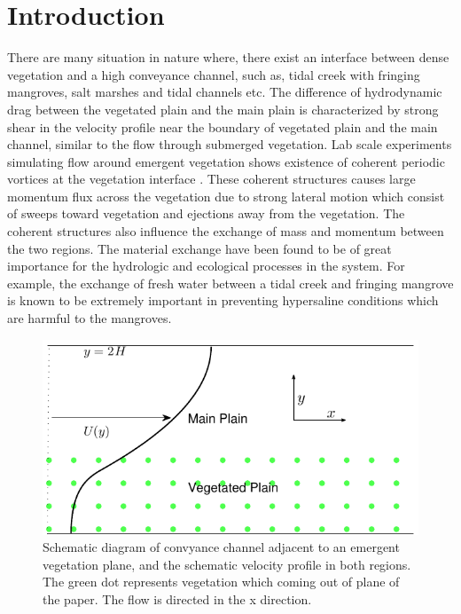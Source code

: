 \documentclass[12pt]{report}   %
\begin{document}
\section{Introduction}
There are many situation in nature where, there exist an interface between dense vegetation and a high conveyance channel, such as, tidal creek with fringing mangroves, salt marshes and tidal channels etc. The difference of hydrodynamic drag between the vegetated plain and the main plain is characterized by strong shear in the velocity profile near the boundary of vegetated plain and the main channel, similar to the flow through submerged vegetation. Lab scale experiments simulating flow around emergent vegetation shows existence of coherent periodic vortices at the vegetation interface \cite{White07}. These coherent structures causes large momentum flux across the vegetation due to strong lateral motion which consist of sweeps toward vegetation and ejections away from the vegetation. The coherent structures also influence the exchange of mass and momentum between the two regions. The material exchange have been found to be of great importance for the hydrologic and ecological processes in the system. For example, the exchange of fresh water between a tidal creek and fringing mangrove is known to be extremely important in preventing hypersaline conditions which are harmful to the mangroves.  

\begin{figure}
\centerline{\includegraphics{GrassBaseIsotropicDrag}}
\caption{Schematic diagram of convyance channel adjacent to an emergent vegetation plane, and the schematic velocity profile in both regions. The green dot represents vegetation which coming out of plane of the paper. The flow is directed in the x direction.}
\label{IsotropicSchematic}
\end{figure}
\end{document}
